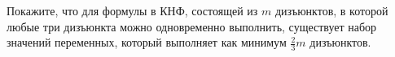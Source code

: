 Покажите, что для формулы в КНФ, состоящей из $m$ дизъюнктов, в которой любые три дизъюнкта можно одновременно выполнить,
существует набор значений переменных, который выполняет как минимум $\frac{2}{3}m$ дизъюнктов.